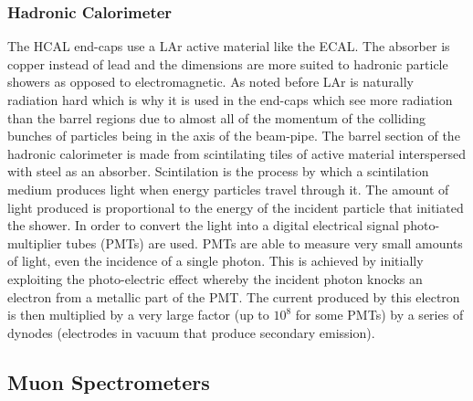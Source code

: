 \subsubsection{Hadronic Calorimeter}
The HCAL end-caps use a LAr active material like the ECAL. The absorber is copper
instead of lead and the dimensions are more suited to hadronic particle showers
as opposed to electromagnetic. As noted before LAr is naturally radiation hard
which is why it is used in the end-caps which see more radiation than the barrel
regions due to almost all of the momentum of the colliding bunches of particles
being in the axis of the beam-pipe. The barrel section of the hadronic
calorimeter is made from scintilating tiles of active material interspersed with
steel as an absorber. Scintilation is the process by
which a scintilation medium produces light when energy particles travel through
it. The amount of light produced is proportional to the energy of the incident
particle that initiated the shower. In order to convert the light into a digital
electrical signal photo-multiplier tubes (PMTs) are used. PMTs are
able to measure very small amounts of light, even the incidence of a single
photon. This is achieved by initially exploiting the photo-electric effect
whereby the incident photon knocks an electron from a metallic part of the PMT.
The current produced by this electron is then multiplied by a very large factor
(up to $10^8$ for some PMTs) by a series of dynodes (electrodes in vacuum that
produce secondary emission).

\subsection{Muon Spectrometers}%
\label{sec:muon}

